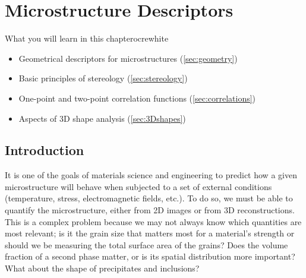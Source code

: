 \renewcommand{\chaptergraphicspath}{../Figures/}




\chapter{Microstructure Descriptors\label{chap:descriptors}}

\begin{messagebox}{What you will learn in this chapter}{ocre}{\icinfo}{white}
\begin{itemize}
	\item Geometrical descriptors for microstructures (\ref{sec:geometry})
	\item Basic principles of stereology (\ref{sec:stereology})
	\item One-point and two-point correlation functions (\ref{sec:correlations})
	\item Aspects of 3D shape analysis (\ref{sec:3Dshapes})
\end{itemize}
\end{messagebox}

\section{Introduction}\label{sec:DescriptorIntroduction}
It is one of the goals of materials science and engineering to predict how a given microstructure will behave when subjected to a set of external conditions (temperature, stress, electromagnetic fields, etc.).  To do so, we must be able to quantify the microstructure, either from 2D images or from 3D reconstructions.   This is a complex problem because we may not always know which quantities are most relevant; is it the grain size that matters most for a material's strength or should we be measuring the total surface area of the grains?  Does the volume fraction of a second phase matter, or is its spatial distribution more important?  What about the shape of precipitates and inclusions? 

